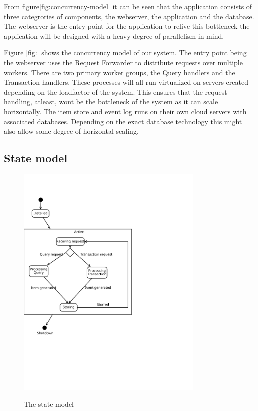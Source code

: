 From figure\ref{fig:concurrency-model} it can be seen that the application consists of
three categrories of components, the webserver, the application and the database.
The webserver is the entry point for the application to relive this bottleneck
the application will be designed with a heavy degree of parallelism in mind.


Figure \ref{fig:} shows the concurrency model of our system.
The entry point being the webserver uses the Request Forwarder to distribute
requests over multiple workers. There are two primary worker groups, the Query
handlers and the Transaction handlers. These processes will all run virtualized on servers
created depending on the loadfactor of the system. This ensures that the request
handling, atleast, wont be the bottleneck of the system as it can scale
horizontally. The item store and event log runs on their own cloud servers with
associated databases. Depending on the exact database technology this might also
allow some degree of horizontal scaling.


\subsection{State model}
\label{sec:state-model}

\begin{figure}[h!]
  \centering
  \caption{The state model}
  \includegraphics[width=0.8\textwidth]{figures/state-model}
  \label{fig:state-model}
\end{figure}


